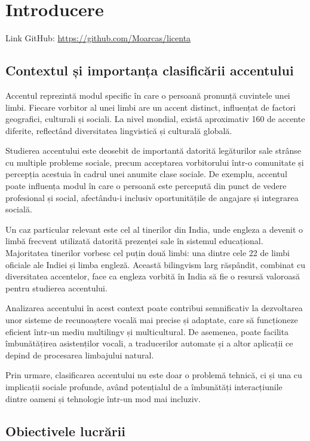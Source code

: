 \chapter{Introducere}

Link GitHub: \href{https://github.com/Moarcas/licenta}{https://github.com/Moarcas/licenta}


\section{Contextul și importanța clasificării accentului}

Accentul reprezintă modul specific în care o persoană pronunță cuvintele unei limbi. Fiecare vorbitor al unei limbi are un 
accent distinct, influențat de factori geografici, culturali și sociali. La nivel mondial, există aproximativ 160 de accente 
diferite, reflectând diversitatea lingvistică și culturală globală.

Studierea accentului este deosebit de importantă datorită legăturilor sale strânse cu multiple probleme sociale, precum 
acceptarea vorbitorului într-o comunitate și percepția acestuia în cadrul unei anumite clase sociale. De exemplu, accentul 
poate influența modul în care o persoană este percepută din punct de vedere profesional și social, afectându-i inclusiv 
oportunitățile de angajare și integrarea socială.

Un caz particular relevant este cel al tinerilor din India, unde engleza a devenit o limbă frecvent utilizată datorită 
prezenței sale în sistemul educațional. Majoritatea tinerilor vorbesc cel puțin două limbi: una dintre cele 22 de limbi 
oficiale ale Indiei și limba engleză. Această bilingvism larg răspândit, combinat cu diversitatea accentelor, face ca engleza 
vorbită în India să fie o resursă valoroasă pentru studierea accentului.

Analizarea accentului în acest context poate contribui semnificativ la dezvoltarea unor sisteme de recunoaștere vocală mai 
precise și adaptate, care să funcționeze eficient într-un mediu multilingv și multicultural. De asemenea, poate facilita 
îmbunătățirea asistenților vocali, a traducerilor automate și a altor aplicații ce depind de procesarea limbajului natural.

Prin urmare, clasificarea accentului nu este doar o problemă tehnică, ci și una cu implicații sociale profunde, având 
potențialul de a îmbunătăți interacțiunile dintre oameni și tehnologie într-un mod mai incluziv.


\section{Obiectivele lucrării}

